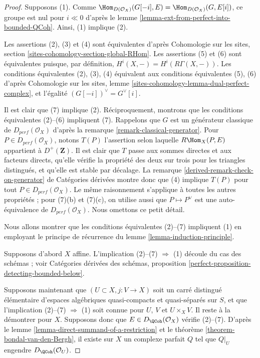\begin{proof}
Supposons (1). Comme
$\Hom_{D(\mathcal{O}_X)}(G[-i],E)=\Hom_{D(\mathcal{O}_X)}(G,E[i])$, ce groupe
est nul pour $i\ll0$ d'apr\`es le lemme
\ref{lemma-ext-from-perfect-into-bounded-QCoh}. Ainsi, (1) implique (2).

\medskip\noindent
Les assertions (2), (3) et (4) sont \'equivalentes d'apr\`es Cohomologie sur
les sites, section \ref{sites-cohomology-section-global-RHom}.
Les assertions (5) et (6) sont \'equivalentes puisque, par d\'efinition,
$H^i(X,-)=H^i(R\Gamma(X,-))$. Les conditions \'equivalentes (2), (3), (4)
\'equivalent aux conditions \'equivalentes (5), (6) d'apr\`es Cohomologie sur
les sites, lemme \ref{sites-cohomology-lemma-dual-perfect-complex}, et
l'\'egalit\'e $(G[-i])^\vee=G^\vee[i]$.

\medskip\noindent
Il est clair que (7) implique (2). R\'eciproquement, montrons que les conditions
\'equivalentes (2)--(6) impliquent (7). Rappelons que $G$ est un g\'en\'erateur
classique de $D_{perf}(\mathcal{O}_X)$ d'apr\`es la remarque
\ref{remark-classical-generator}. Pour $P\in D_{perf}(\mathcal{O}_X)$, notons
$T(P)$ l'assertion selon laquelle $R\Hom_X(P,E)$ appartient \`a
$D^+(\mathbf{Z})$. Il est clair que $T$ passe aux sommes directes et aux
facteurs directs, qu'elle v\'erifie la propri\'et\'e des deux sur trois pour les
triangles distingu\'es, et qu'elle est stable par d\'ecalage. La remarque
\ref{derived-remark-check-on-generator} de Cat\'egories d\'eriv\'ees montre donc
que (4) implique $T(P)$ pour tout $P\in D_{perf}(\mathcal{O}_X)$. Le m\^eme
raisonnement s'applique \`a toutes les autres propri\'et\'es ; pour (7)(b) et
(7)(c), on utilise aussi que $P\mapsto P^\vee$ est une auto-\'equivalence de
$D_{perf}(\mathcal{O}_X)$. Nous omettons ce petit d\'etail.

\medskip\noindent
Nous allons montrer que les conditions \'equivalentes (2)--(7) impliquent (1)
en employant le principe de r\'ecurrence du lemme
\ref{lemma-induction-principle}.

\medskip\noindent
Supposons d'abord $X$ affine. L'implication (2)--(7) $\Rightarrow$ (1) d\'ecoule
du cas des sch\'emas ; voir Cat\'egories d\'eriv\'ees des sch\'emas, proposition
\ref{perfect-proposition-detecting-bounded-below}.

\medskip\noindent
Supposons maintenant que $(U\subset X,j:V\to X)$ soit un carr\'e distingu\'e
\'el\'ementaire d'espaces alg\'ebriques quasi-compacts et quasi-s\'epar\'es sur
$S$, et que l'implication (2)--(7) $\Rightarrow$ (1) soit connue pour $U$, $V$
et $U\times_XV$. Il reste \`a la d\'emontrer pour $X$. Supposons donc que
$E\in D_\QCoh(\mathcal{O}_X)$ v\'erifie (2)--(7). D'apr\`es le lemme
\ref{lemma-direct-summand-of-a-restriction} et le th\'eor\`eme
\ref{theorem-bondal-van-den-Bergh}, il existe sur $X$ un complexe parfait $Q$
tel que $Q|_U$ engendre $D_\QCoh(\mathcal{O}_U)$.


\end{proof}
